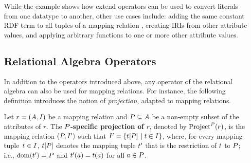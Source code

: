 While the example shows how extend operators can be used to convert literals from one datatype to another, other use cases include: adding the same constant RDF term to all tuples of a mapping relation%
, creating IRIs from other attribute values, and applying arbitrary functions to one or more other attribute values.


\vspace{-2mm} %
\enlargethispage{\baselineskip}%

\subsection{Relational Algebra Operators}

\vspace{-2mm} %

In addition to the operators introduced above, any operator of the relational algebra can also be used for mapping relations. For instance, the following definition introduces the notion of \emph{projection}, adapted to mapping relations.

\begin{definition}
	\label{def:projection_operator}
	\normalfont
	Let $r = (A, I)$ be a mapping relation and $P \subseteq
		A$ be a non-empty subset of the
	attributes of $r$.
	The \textbf{$P$-specific projection of $r$}, denoted by $\text{Project}^{P}(r)$, is the mapping relation
		$(P,I')$ such that $I' = \{ t[P] \ | \ t \in I \}$,
	where, for every mapping tuple~$t \in I$, $t[P]$ denotes the mapping tuple $t'$ that is the restriction of $t$ to $P$;
	i.e., $\mathrm{dom}(t') = P$ and $t'(a) = t(a)$ for all $a \in P$.
\end{definition}

